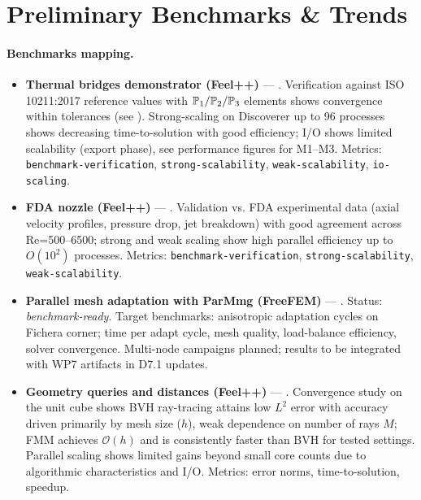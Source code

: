 \section{Preliminary Benchmarks \& Trends}







\paragraph{Benchmarks mapping.}
\begin{itemize}
    \item \textbf{Thermal bridges demonstrator (Feel++)} — . Verification against ISO 10211:2017 reference values with $\mathbb{P}_1/\mathbb{P}_2/\mathbb{P}_3$ elements shows convergence within tolerances (see ). Strong-scaling on Discoverer up to 96 processes shows decreasing time-to-solution with good efficiency; I/O shows limited scalability (export phase), see performance figures for M1–M3. Metrics: \texttt{benchmark-verification}, \texttt{strong-scalability}, \texttt{weak-scalability}, \texttt{io-scaling}.
    \item \textbf{FDA nozzle (Feel++)} — . Validation vs. FDA experimental data (axial velocity profiles, pressure drop, jet breakdown) with good agreement across Re=500–6500; strong and weak scaling show high parallel efficiency up to $O(10^2)$ processes. Metrics: \texttt{benchmark-verification}, \texttt{strong-scalability}, \texttt{weak-scalability}.
    \item \textbf{Parallel mesh adaptation with ParMmg (FreeFEM)} — . Status: \emph{benchmark-ready}. Target benchmarks: anisotropic adaptation cycles on Fichera corner; time per adapt cycle, mesh quality, load-balance efficiency, solver convergence. Multi-node campaigns planned; results to be integrated with WP7 artifacts in D7.1 updates.
    \item \textbf{Geometry queries and distances (Feel++)} — . Convergence study on the unit cube shows BVH ray-tracing attains low $L^2$ error with accuracy driven primarily by mesh size ($h$), weak dependence on number of rays $M$; FMM achieves $\mathcal{O}(h)$ and is consistently faster than BVH for tested settings. Parallel scaling shows limited gains beyond small core counts due to algorithmic characteristics and I/O. Metrics: error norms, time-to-solution, speedup.
\end{itemize}

